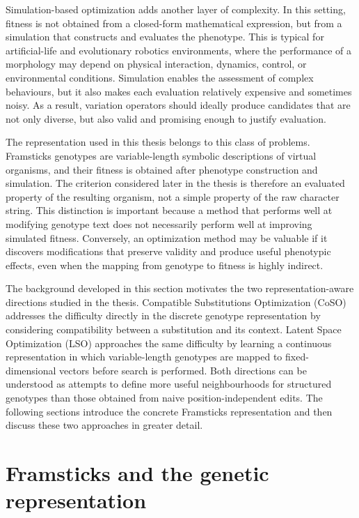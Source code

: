 Simulation-based optimization adds another layer of complexity. In this setting, fitness is not obtained from a closed-form mathematical expression, but from a simulation that constructs and evaluates the phenotype. This is typical for artificial-life and evolutionary robotics environments, where the performance of a morphology may depend on physical interaction, dynamics, control, or environmental conditions. Simulation enables the assessment of complex behaviours, but it also makes each evaluation relatively expensive and sometimes noisy. As a result, variation operators should ideally produce candidates that are not only diverse, but also valid and promising enough to justify evaluation.

The representation used in this thesis belongs to this class of problems. Framsticks \fone{} genotypes are variable-length symbolic descriptions of virtual organisms, and their fitness is obtained after phenotype construction and simulation. The \vertpos{} criterion considered later in the thesis is therefore an evaluated property of the resulting organism, not a simple property of the raw character string. This distinction is important because a method that performs well at modifying genotype text does not necessarily perform well at improving simulated fitness. Conversely, an optimization method may be valuable if it discovers modifications that preserve validity and produce useful phenotypic effects, even when the mapping from genotype to fitness is highly indirect.

The background developed in this section motivates the two representation-aware directions studied in the thesis. Compatible Substitutions Optimization (CoSO) addresses the difficulty directly in the discrete genotype representation by considering compatibility between a substitution and its context. Latent Space Optimization (LSO) approaches the same difficulty by learning a continuous representation in which variable-length genotypes are mapped to fixed-dimensional vectors before search is performed. Both directions can be understood as attempts to define more useful neighbourhoods for structured genotypes than those obtained from naive position-independent edits. The following sections introduce the concrete Framsticks \fone{} representation and then discuss these two approaches in greater detail.

\section{Framsticks and the \fone{} genetic representation}

